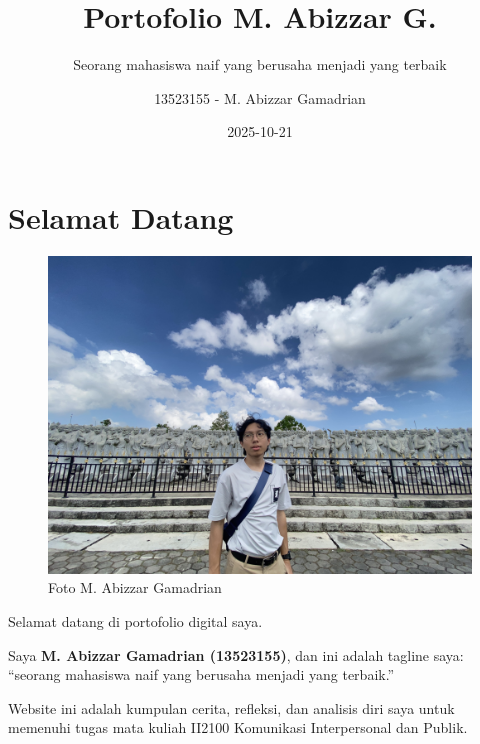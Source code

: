 \documentclass[
  letterpaper,
  DIV=11,
  numbers=noendperiod]{scrreprt}
\title{Portofolio M. Abizzar G.}
\subtitle{Seorang mahasiswa naif yang berusaha menjadi yang terbaik}
\author{13523155 - M. Abizzar Gamadrian}
\date{2025-10-21}
\renewcommand*\contentsname{Table of contents}
\newcommand\contentsname{Table of contents}
\begin{document}
\maketitle

\renewcommand*\contentsname{Table of contents}
{
\hypersetup{linkcolor=}
\setcounter{tocdepth}{2}
\tableofcontents
}


\chapter*{Selamat Datang}\label{selamat-datang}


\begin{figure}[H]

{\centering \includegraphics[width=9.5\linewidth,height=\textheight,keepaspectratio]{images/profile.jpg}

}

\caption{Foto M. Abizzar Gamadrian}

\end{figure}%

Selamat datang di portofolio digital saya.

Saya \textbf{M. Abizzar Gamadrian (13523155)}, dan ini adalah tagline
saya: ``seorang mahasiswa naif yang berusaha menjadi yang terbaik.''

Website ini adalah kumpulan cerita, refleksi, dan analisis diri saya
untuk memenuhi tugas mata kuliah II2100 Komunikasi Interpersonal dan
Publik.
\end{document}
